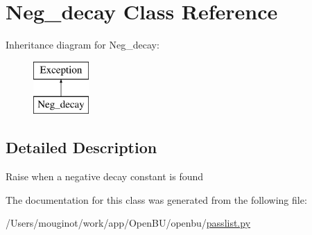 \hypertarget{classopenbu_1_1passlist_1_1_neg__decay}{}\section{Neg\+\_\+decay Class Reference}
\label{classopenbu_1_1passlist_1_1_neg__decay}
Inheritance diagram for Neg\+\_\+decay\+:\begin{figure}[H]
\begin{center}
\leavevmode
\includegraphics[height=2.000000cm]{classopenbu_1_1passlist_1_1_neg__decay}
\end{center}
\end{figure}


\subsection{Detailed Description}
\begin{DoxyVerb}Raise when a negative decay constant is found\end{DoxyVerb}
 

The documentation for this class was generated from the following file\+:\begin{DoxyCompactItemize}
\item 
/\+Users/mouginot/work/app/\+Open\+B\+U/openbu/\mbox{\hyperlink{passlist_8py}{passlist.\+py}}\end{DoxyCompactItemize}
